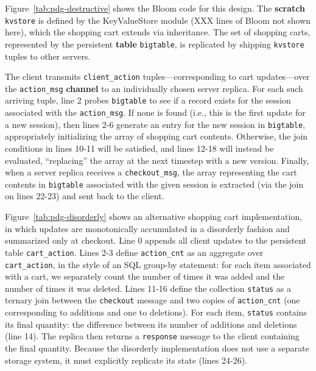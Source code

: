 Figure~\ref{tab:pdg-destructive} shows the Bloom code for this design.  The
\textbf{scratch} \texttt{kvstore} is defined by the KeyValueStore module (XXX
lines of Bloom not shown here), which the shopping cart extends via
inheritance.
The set of shopping carts, represented by the persistent \textbf{table}
\texttt{bigtable}, is 
replicated by shipping \texttt{kvstore} tuples to other servers.


The client transmits \texttt{client\_action} tuples---corresponding to cart
updates---over the \texttt{action\_msg} \textbf{channel} to an individually
chosen server replica.
For each such arriving
tuple, line 2 probes \texttt{bigtable} to see if a record exists for the
session associated with the \texttt{action\_msg}.  If none is found (i.e., this
is the first update for a new session), then lines 2-6 generate an entry for
the new session in \texttt{bigtable}, appropriately initializing the array of
shopping cart contents.  Otherwise, the join conditions in lines 10-11 will be
satisfied, and lines 12-18 will instead be evaluated, ``replacing'' the array
at the next timestep with a new version.  Finally, when a server replica
receives a \texttt{checkout\_msg}, the array representing the cart contents in
\texttt{bigtable} associated with the given session is extracted (via the join
on lines 22-23) and sent back to the client.

Figure~\ref{tab:pdg-disorderly} shows an alternative shopping cart implementation, in which
updates are monotonically accumulated in a disorderly fashion and summarized
only at checkout.  Line 0 appends all client updates to the persistent table
\texttt{cart\_action}.  Lines 2-3 define \texttt{action\_cnt} as an aggregate
over \texttt{cart\_action}, in the style of an SQL group-by statement: for each
item associated with a cart, we separately count the number of times it was
added and the number of times it was deleted.  
 Lines 11-16 define the collection
\texttt{status} as a ternary join between the \texttt{checkout} message and two
copies of \texttt{action\_cnt} (one corresponding to additions and one to
deletions).  For each item, \texttt{status} contains its final quantity: the
difference between its number of additions and deletions (line 14).  The
replica then returns a \texttt{response} message to the client containing the
final quantity.  Because the disorderly implementation does not use a separate
storage system, it must explicitly replicate its state (lines 24-26).


